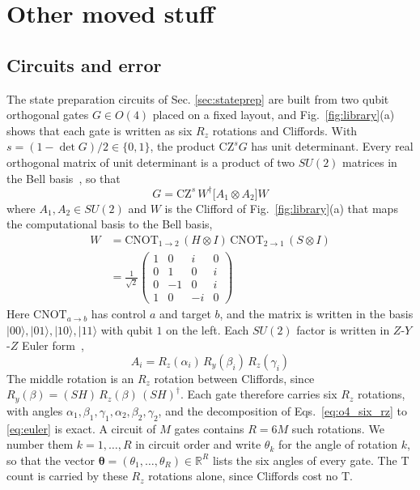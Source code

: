 \section{Other moved stuff}

\subsection{Circuits and error}
\label{sec:snap_conventions}
The state preparation circuits of Sec. \ref{sec:stateprep} are built from two qubit orthogonal gates $G \in O(4)$ placed on a fixed layout, and Fig.~\ref{fig:library}(a) shows that each gate is written as six $R_z$ rotations and Cliffords. With $s = (1 - \det G)/2 \in \{0, 1\}$, the product $\mathrm{CZ}^{s} G$ has unit determinant. Every real orthogonal matrix of unit determinant is a product of two $SU(2)$ matrices in the Bell basis~\cite{VatanWilliams2004}, so that
\begin{equation}
G = \mathrm{CZ}^{s}\, W^{\dagger} \big[ A_1 \otimes A_2 \big] W
\label{eq:o4_six_rz}
\end{equation}
where $A_1, A_2 \in SU(2)$ and $W$ is the Clifford of Fig.~\ref{fig:library}(a) that maps the computational basis to the Bell basis,
\begin{equation}
\begin{split}
W &= \mathrm{CNOT}_{1\to 2}\, (H \otimes I)\, \mathrm{CNOT}_{2\to 1}\, (S \otimes I) \\
&= \frac{1}{\sqrt{2}} \begin{pmatrix} 1 & 0 & i & 0 \\ 0 & 1 & 0 & i \\ 0 & -1 & 0 & i \\ 1 & 0 & -i & 0 \end{pmatrix}
\end{split}
\label{eq:W}
\end{equation}
Here $\mathrm{CNOT}_{a\to b}$ has control $a$ and target $b$, and the matrix is written in the basis $|00\rangle, |01\rangle, |10\rangle, |11\rangle$ with qubit $1$ on the left. Each $SU(2)$ factor is written in $Z$-$Y$-$Z$ Euler form~\cite{NielsenChuang},
\begin{equation}
A_i = R_z(\alpha_i)\, R_y(\beta_i)\, R_z(\gamma_i)
\label{eq:euler}
\end{equation}
The middle rotation is an $R_z$ rotation between Cliffords, since $R_y(\beta) = (SH)\, R_z(\beta)\, (SH)^{\dagger}$. Each gate therefore carries six $R_z$ rotations, with angles $\alpha_1, \beta_1, \gamma_1, \alpha_2, \beta_2, \gamma_2$, and the decomposition of Eqs.~\eqref{eq:o4_six_rz} to \eqref{eq:euler} is exact. A circuit of $M$ gates contains $R = 6M$ such rotations. We number them $k = 1, \dots, R$ in circuit order and write $\theta_k$ for the angle of rotation $k$, so that the vector $\boldsymbol{\theta} = (\theta_1, \dots, \theta_R) \in \mathbb{R}^{R}$ lists the six angles of every gate. The T count is carried by these $R_z$ rotations alone, since Cliffords cost no T.

